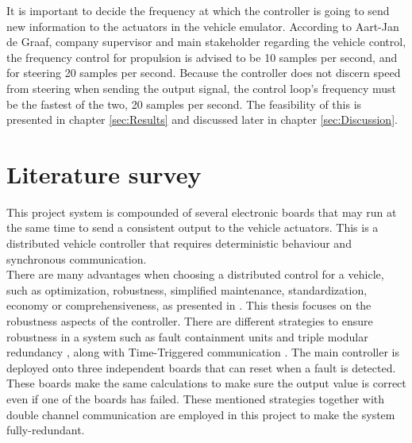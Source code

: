 \documentclass[table,xcdraw]{article}
\begin{document}
It is important to decide the frequency at which the controller is going to send new information to the actuators in the vehicle emulator. According to Aart-Jan de Graaf, company supervisor and main stakeholder regarding the vehicle control, the frequency control for propulsion is advised to be 10 samples per second, and for steering 20 samples per second. Because the controller does not discern speed from steering when sending the output signal, the control loop's frequency must be the fastest of the two, 20 samples per second. The feasibility of this is presented in chapter \ref{sec:Results} and discussed later in chapter \ref{sec:Discussion}.

\newpage


\section{Literature survey} \label{sec:Literature_Survey}
This project system is compounded of several electronic boards that may run at the same time to send a consistent output to the vehicle actuators. This is a distributed vehicle controller that requires deterministic behaviour and synchronous communication.\\

There are many advantages when choosing a distributed control for a vehicle, such as optimization, robustness, simplified maintenance, standardization, economy or comprehensiveness, as presented in \citep{advantages_distributed_control}. This thesis focuses on the robustness aspects of the controller. There are different strategies to ensure robustness in a system such as fault containment units and triple modular redundancy \citep{kopetz_robustness}, along with Time-Triggered communication \citep{kopetz_tt_comm}. The main controller is deployed onto three independent boards that can reset when a fault is detected. These boards make the same calculations to make sure the output value is correct even if one of the boards has failed. These mentioned strategies together with double channel communication are employed in this project to make the system fully-redundant.\\
\end{document}
